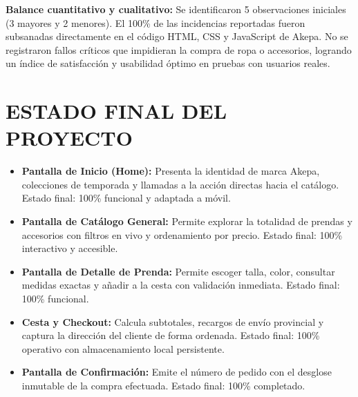 \documentclass[12pt]{article}
\begin{document}
\textbf{Balance cuantitativo y cualitativo:}
Se identificaron 5 observaciones iniciales (3 mayores y 2 menores). El 100\% de las incidencias reportadas fueron subsanadas directamente en el código HTML, CSS y JavaScript de Akepa. No se registraron fallos críticos que impidieran la compra de ropa o accesorios, logrando un índice de satisfacción y usabilidad óptimo en pruebas con usuarios reales.

\section*{ESTADO FINAL DEL PROYECTO}
\begin{itemize}
    \item \textbf{Pantalla de Inicio (Home):} Presenta la identidad de marca Akepa, colecciones de temporada y llamadas a la acción directas hacia el catálogo. Estado final: 100\% funcional y adaptada a móvil.
    \item \textbf{Pantalla de Catálogo General:} Permite explorar la totalidad de prendas y accesorios con filtros en vivo y ordenamiento por precio. Estado final: 100\% interactivo y accesible.
    \item \textbf{Pantalla de Detalle de Prenda:} Permite escoger talla, color, consultar medidas exactas y añadir a la cesta con validación inmediata. Estado final: 100\% funcional.
    \item \textbf{Cesta y Checkout:} Calcula subtotales, recargos de envío provincial y captura la dirección del cliente de forma ordenada. Estado final: 100\% operativo con almacenamiento local persistente.
    \item \textbf{Pantalla de Confirmación:} Emite el número de pedido con el desglose inmutable de la compra efectuada. Estado final: 100\% completado.
\end{itemize}
\end{document}
